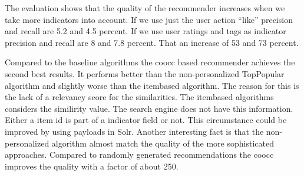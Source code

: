 The evaluation shows that the quality of the recommender increases when we take more indicators into account. If we use just the user action ``like'' precision and recall are 5.2 and 4.5 percent. If we use user ratings and tags as indicator precision and recall are  8 and 7.8 percent. That an increase of 53 and 73 percent.

Compared to the baseline algorithms the \gls{coocc} based recommender achieves the second best results. It performs better than the non-personalized TopPopular algorithm and slightly worse than the itembased algorithm. The reason for this is the lack of a relevancy score for the similarities. The itembased algorithms considers the similirity value. The search engine does not have this information. Either a item id is part of a indicator field or not. This circumstance could be improved by using payloads in Solr. Another interesting fact is that the non-personalized algorithm almost match the quality of the more sophisticated approaches. Compared to randomly generated recommendations the \gls{coocc} improves the quality with a factor of about 250.
